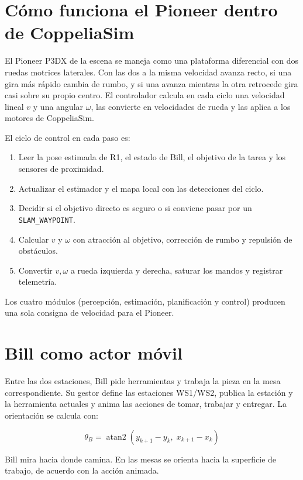 \section{Cómo funciona el Pioneer dentro de CoppeliaSim}

El Pioneer P3DX de la escena se maneja como una plataforma diferencial con dos
ruedas motrices laterales. Con las dos a la misma velocidad avanza recto, si una
gira más rápido cambia de rumbo, y si una avanza mientras la otra retrocede gira
casi sobre su propio centro. El controlador calcula en cada ciclo una velocidad
lineal \(v\) y una angular \(\omega\), las convierte en velocidades de rueda y las
aplica a los motores de CoppeliaSim.

El ciclo de control en cada paso es:

\begin{enumerate}
  \item Leer la pose estimada de R1, el estado de Bill, el objetivo de la tarea y
  los sensores de proximidad.
  \item Actualizar el estimador y el mapa local con las detecciones del ciclo.
  \item Decidir si el objetivo directo es seguro o si conviene pasar por un
  \texttt{SLAM\_WAYPOINT}.
  \item Calcular \(v\) y \(\omega\) con atracción al objetivo, corrección de
  rumbo y repulsión de obstáculos.
  \item Convertir \(v,\omega\) a rueda izquierda y derecha, saturar los mandos y
  registrar telemetría.
\end{enumerate}

Los cuatro módulos (percepción, estimación, planificación y control) producen
una sola consigna de velocidad para el Pioneer.

\section{Bill como actor móvil}

Entre las dos estaciones, Bill pide herramientas y trabaja la pieza en la mesa
correspondiente. Su gestor define las estaciones WS1/WS2, publica la estación y
la herramienta actuales y anima las acciones de tomar, trabajar y entregar. La
orientación se calcula con:

\[
\theta_B = \operatorname{atan2}(y_{k+1}-y_k,\;x_{k+1}-x_k)
\]

Bill mira hacia donde camina. En las mesas se orienta hacia la superficie de
trabajo, de acuerdo con la acción animada.

